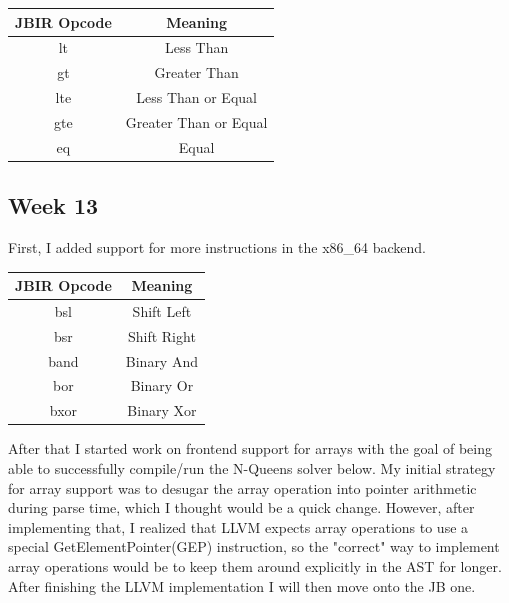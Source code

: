 \documentclass[11pt, a4paper, titlepage]{article}
\begin{document}
\begin{table}[h!]
  \centering
  \begin{tabular}{|c|c|}
  \hline
  \textbf{JBIR Opcode} & \textbf{Meaning} \\
  \hline
  \hline
  lt & Less Than \\
  \hline
  gt & Greater Than \\
  \hline
  lte & Less Than or Equal \\
  \hline
  gte & Greater Than or Equal \\
  \hline
  eq & Equal \\
  \hline
  \end{tabular}
\end{table}
  
\subsection{Week 13}

First, I added support for more instructions in the x86\_64 backend.

\begin{table}[h!]
  \centering
  \begin{tabular}{|c|c|}
  \hline
  \textbf{JBIR Opcode} & \textbf{Meaning} \\
  \hline
  \hline
  bsl & Shift Left \\
  \hline
  bsr & Shift Right \\
  \hline
  band & Binary And \\
  \hline
  bor & Binary Or \\
  \hline
  bxor & Binary Xor \\
  \hline
  \end{tabular}
\end{table}

After that I started work on frontend support for arrays with the goal of being able to successfully compile/run the N-Queens solver below.
My initial strategy for array support was to desugar the array operation into pointer arithmetic during parse time, which I thought would be a quick change.
However, after implementing that, I realized that LLVM expects array operations to use a special GetElementPointer(GEP) instruction, so the "correct" way to implement array operations would be to keep them around explicitly in the AST for longer.
After finishing the LLVM implementation I will then move onto the JB one.
\end{document}
